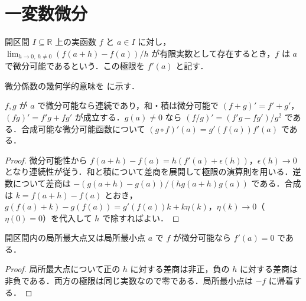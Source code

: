 \section{一変数微分}
\begin{defn}[一変数函数の微分]
開区間 $I\subseteq\mathbb R$ 上の実函数 $f$ と $a\in I$ に対し，$\lim_{h\to0,\ h\ne0}(f(a+h)-f(a))/h$ が有限実数として存在するとき，$f$ は $a$ で微分可能であるという．この極限を $f'(a)$ と記す．
\end{defn}
微分係数の幾何学的意味を  に示す．
\begin{prop}[微分の演算法則]
$f,g$ が $a$ で微分可能なら連続であり，和・積は微分可能で $(f+g)'=f'+g'$，$(fg)'=f'g+fg'$ が成立する．$g(a)\ne0$ なら $(f/g)'=(f'g-fg')/g^2$ である．合成可能な微分可能函数について $(g\circ f)'(a)=g'(f(a))f'(a)$ である．
\end{prop}
\begin{proof}
微分可能性から $f(a+h)-f(a)=h(f'(a)+\epsilon(h))$，$\epsilon(h)\to0$ となり連続性が従う．和と積について差商を展開して極限の演算則を用いる．逆数について差商は $-(g(a+h)-g(a))/(hg(a+h)g(a))$ である．合成は $k=f(a+h)-f(a)$ とおき，$g(f(a)+k)-g(f(a))=g'(f(a))k+k\eta(k)$，$\eta(k)\to0$（$\eta(0)=0$）を代入して $h$ で除すればよい．
\end{proof}
\begin{prop}[極値における微分係数]
開区間内の局所最大点又は局所最小点 $a$ で $f$ が微分可能なら $f'(a)=0$ である．
\end{prop}
\begin{proof}
局所最大点について正の $h$ に対する差商は非正，負の $h$ に対する差商は非負である．両方の極限は同じ実数なので零である．局所最小点は $-f$ に帰着する．
\end{proof}
